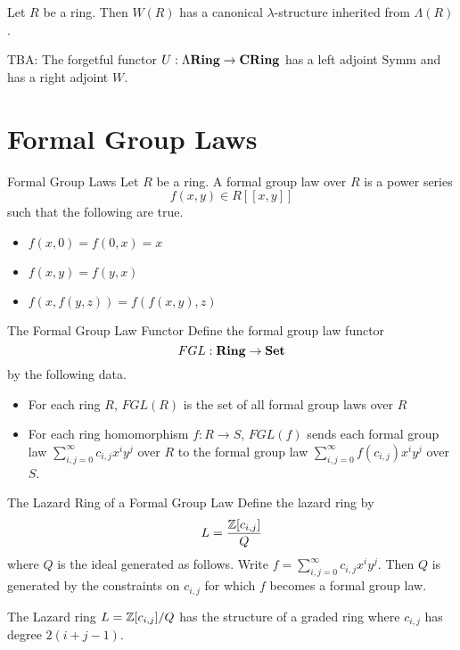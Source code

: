 \documentclass[a4paper]{article}
\begin{document}
\begin{crl}{}{} Let $R$ be a ring. Then $W(R)$ has a canonical $\lambda$-structure inherited from $\Lambda(R)$. 
\end{crl}

TBA: The forgetful functor $U:\Lambda\bold{Ring}\to\bold{CRing}$ has a left adjoint $\text{Symm}$ and has a right adjoint $W$. 


\pagebreak
\section{Formal Group Laws}
\begin{defn}{Formal Group Laws}{} Let $R$ be a ring. A formal group law over $R$ is a power series $$f(x,y)\in R[[x,y]]$$ such that the following are true. 
\begin{itemize}
\item $f(x,0)=f(0,x)=x$
\item $f(x,y)=f(y,x)$
\item $f(x,f(y,z))=f(f(x,y),z)$
\end{itemize}
\end{defn}

\begin{defn}{The Formal Group Law Functor}{} Define the formal group law functor $$FGL:\bold{Ring}\to\bold{Set}$$ by the following data. 
\begin{itemize}
\item For each ring $R$, $FGL(R)$ is the set of all formal group laws over $R$
\item For each ring homomorphism $f:R\to S$, $FGL(f)$ sends each formal group law $\sum_{i,j=0}^\infty c_{i,j}x^iy^j$ over $R$ to the formal group law $\sum_{i,j=0}^\infty f(c_{i,j})x^iy^j$ over $S$. 
\end{itemize}
\end{defn}

\begin{defn}{The Lazard Ring of a Formal Group Law}{} Define the lazard ring by $$L=\frac{\mathbb{Z}[c_{i,j}]}{Q}$$ where $Q$ is the ideal generated as follows. Write $f=\sum_{i,j=0}^\infty c_{i,j}x^iy^j$. Then $Q$ is generated by the constraints on $c_{i,j}$ for which $f$ becomes a formal group law. 
\end{defn}

\begin{lmm}{}{} The Lazard ring $L=\mathbb{Z}[c_{i,j}]/Q$ has the structure of a graded ring where $c_{i,j}$ has degree $2(i+j-1)$. 
\end{lmm}
\end{document}
